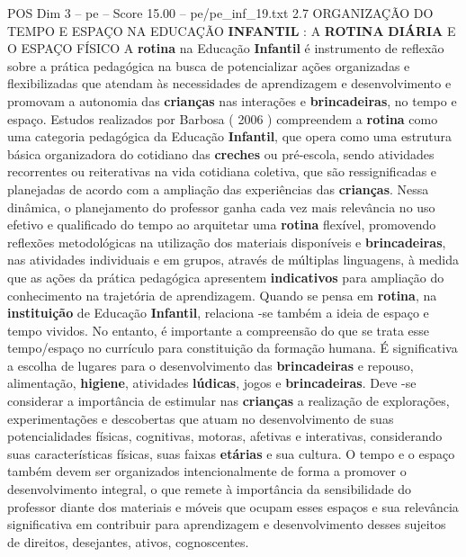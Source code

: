 \begin{textsample}{POS Dim 3 – pe – Score 15.00 – pe/pe\_inf\_19.txt}  \label{ex:f3_pos_277}
2.7 ORGANIZAÇÃO DO TEMPO E ESPAÇO NA EDUCAÇÃO \textbf{INFANTIL} : A \textbf{ROTINA} \textbf{DIÁRIA} E O ESPAÇO FÍSICO A \textbf{rotina} na Educação \textbf{Infantil} é instrumento de reflexão sobre a prática pedagógica na busca de potencializar ações organizadas e flexibilizadas que atendam às necessidades de aprendizagem e desenvolvimento e promovam a autonomia das \textbf{crianças} nas interações e \textbf{brincadeiras}, no tempo e espaço.
Estudos realizados por Barbosa ( 2006 ) compreendem a \textbf{rotina} como uma categoria pedagógica da Educação \textbf{Infantil}, que opera como uma estrutura básica organizadora do cotidiano das \textbf{creches} ou pré-escola, sendo atividades recorrentes ou reiterativas na vida cotidiana coletiva, que são ressignificadas e planejadas de acordo com a ampliação das experiências das \textbf{crianças}.
Nessa dinâmica, o planejamento do professor ganha cada vez mais relevância no uso efetivo e qualificado do tempo ao arquitetar uma \textbf{rotina} flexível, promovendo reflexões metodológicas na utilização dos materiais disponíveis e \textbf{brincadeiras}, nas atividades individuais e em grupos, através de múltiplas linguagens, à medida que as ações da prática pedagógica apresentem \textbf{indicativos} para ampliação do conhecimento na trajetória de aprendizagem.
Quando se pensa em \textbf{rotina}, na \textbf{instituição} de Educação \textbf{Infantil}, relaciona -se também a ideia de espaço e tempo vividos.
No entanto, é importante a compreensão do que se trata esse tempo/espaço no currículo para constituição da formação humana.
É significativa a escolha de lugares para o desenvolvimento das \textbf{brincadeiras} e repouso, alimentação, \textbf{higiene}, atividades \textbf{lúdicas}, jogos e \textbf{brincadeiras}.
Deve -se considerar a importância de estimular nas \textbf{crianças} a realização de explorações, experimentações e descobertas que atuam no desenvolvimento de suas potencialidades físicas, cognitivas, motoras, afetivas e interativas, considerando suas características físicas, suas faixas \textbf{etárias} e sua cultura.
O tempo e o espaço também devem ser organizados intencionalmente de forma a promover o desenvolvimento integral, o que remete à importância da sensibilidade do professor diante dos materiais e móveis que ocupam esses espaços e sua relevância significativa em contribuir para aprendizagem e desenvolvimento desses sujeitos de direitos, desejantes, ativos, cognoscentes.

\end{textsample}
